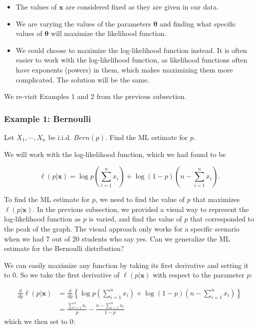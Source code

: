 \documentclass[
]{book}
\providecommand{\tightlist}{%
  \setlength{\itemsep}{0pt}\setlength{\parskip}{0pt}}
\begin{document}
\begin{itemize}
\tightlist
\item
  The values of \(\boldsymbol{x}\) are considered fixed as they are given in our data.
\item
  We are varying the values of the parameters \(\boldsymbol{\theta}\) and finding what specific values of \(\boldsymbol{\theta}\) will maximize the likelihood function.
\item
  We could choose to maximize the log-likelihood function instead. It is often easier to work with the log-likelihood function, as likelihood functions often have exponents (powers) in them, which makes maximizing them more complicated. The solution will be the same.
\end{itemize}

We re-visit Examples 1 and 2 from the previous subsection.

\hypertarget{example-1-bernoulli-1}{%
\subsubsection{Example 1: Bernoulli}\label{example-1-bernoulli-1}}

Let \(X_1, \cdots, X_n\) be i.i.d. \(Bern(p)\). Find the ML estimate for \(p\).

We will work with the log-likelihood function, which we had found to be

\[
\ell (p | \boldsymbol{x}) = \log p \left(\sum_{i=1}^n x_i \right) + \log (1-p) \left( n - \sum_{i=1}^n x_i \right).
\]

To find the ML estimate for \(p\), we need to find the value of \(p\) that maximizes \(\ell (p | \boldsymbol{x})\). In the previous subsection, we provided a visual way to represent the log-likelihood function as \(p\) is varied, and find the value of \(p\) that corresponded to the peak of the graph. The visual approach only works for a specific scenario when we had 7 out of 20 students who say yes. Can we generalize the ML estimate for the Bernoulli distribution?

We can easily maximize any function by taking its first derivative and setting it to 0. So we take the first derivative of \(\ell (p | \boldsymbol{x})\) with respect to the parameter \(p\):

\[
\begin{split}
\frac{d}{d p}\ell (p | \boldsymbol{x}) &= \frac{d}{d p} \left\{ \log p \left(\sum_{i=1}^n x_i \right) + \log (1-p) \left( n - \sum_{i=1}^n x_i \right) \right\}\\
                          &= \frac{\sum_{i=1}^n x_i}{p} - \frac{n - \sum_{i=1}^n x_i}{1-p}
\end{split}
\]
which we then set to 0:
\end{document}
